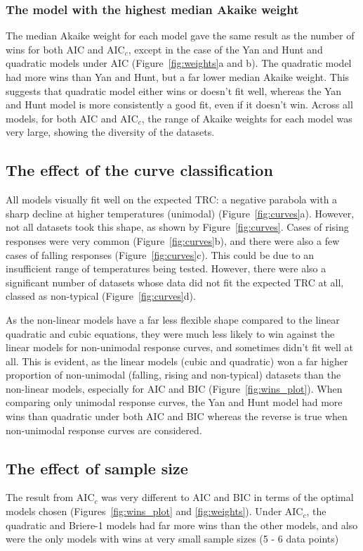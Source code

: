 \documentclass[11pt, a4paper]{article}
\begin{document}
\subsubsection*{The model with the highest median Akaike weight}
The median Akaike weight for each model gave the same result as the number of wins for both AIC and AIC$_c$, except in the case of the Yan and Hunt and quadratic models under AIC (Figure~\ref{fig:weights}a and b). The quadratic model had more wins than Yan and Hunt, but a far lower median Akaike weight. This suggests that quadratic model either wins or doesn't fit well, whereas the Yan and Hunt model is more consistently a good fit, even if it doesn't win. Across all models, for both AIC and AIC$_c$, the range of Akaike weights for each model was very large, showing the diversity of the datasets.

\subsection{The effect of the curve classification}
All models visually fit well on the expected TRC: a negative parabola with a sharp decline at higher temperatures (unimodal) (Figure~\ref{fig:curves}a). However, not all datasets took this shape, as shown by Figure~\ref{fig:curves}. Cases of rising responses were very common (Figure~\ref{fig:curves}b), and there were also a few cases of falling responses (Figure~\ref{fig:curves}c). This could be due to an insufficient range of temperatures being tested. However, there were also a significant number of datasets whose data did not fit the expected TRC at all, classed as non-typical (Figure~\ref{fig:curves}d).

As the non-linear models have a far less flexible shape compared to the linear quadratic and cubic equations, they were much less likely to win against the linear models for non-unimodal response curves, and sometimes didn't fit well at all. This is evident, as the linear models (cubic and quadratic) won a far higher proportion of non-unimodal (falling, rising and non-typical) datasets than the non-linear models, especially for AIC and BIC (Figure~\ref{fig:wins_plot}). When comparing only unimodal response curves, the Yan and Hunt model had more wins than quadratic under both AIC and BIC whereas the reverse is true when non-unimodal response curves are considered.


\subsection{The effect of sample size}
The result from AIC$_c$ was very different to AIC and BIC in terms of the optimal models chosen (Figures~\ref{fig:wins_plot} and \ref{fig:weights}). Under AIC$_c$, the quadratic and Briere-1 models had far more wins than the other models, and also were the only models with wins at very small sample sizes (5 - 6 data points) 
\end{document}
